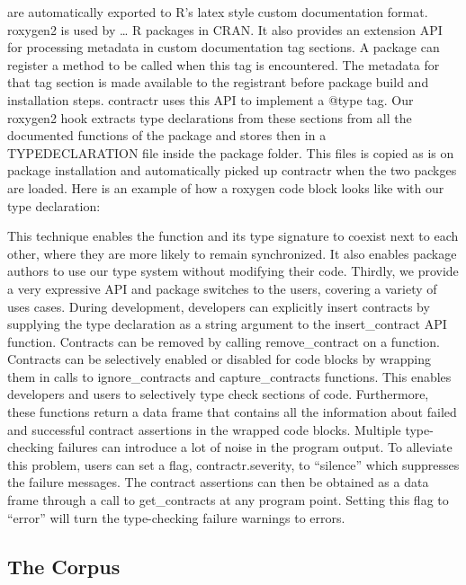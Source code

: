 \documentclass[acmsmall,review,anonymous]{acmart}\settopmatter{printfolios=true,printccs=false,printacmref=false}
\begin{document}
are automatically exported to R's latex style custom documentation format.
roxygen2 is used by … R packages in CRAN. It also provides an extension API for
processing metadata in custom documentation tag sections. A package can register
a method to be called when this tag is encountered. The metadata for that tag
section is made available to the registrant before package build and
installation steps. contractr uses this API to implement a @type tag. Our
roxygen2 hook extracts type declarations from these sections from all the
documented functions of the package and stores then in a TYPEDECLARATION file
inside the package folder. This files is copied as is on package installation
and automatically picked up contractr when the two packges are loaded.
Here is an example of how a roxygen code block looks like with our type declaration:


This technique enables the function and its type signature to coexist next to
each other, where they are more likely to remain synchronized. It also enables
package authors to use our type system without modifying their code.
Thirdly, we provide a very expressive API and package switches to the users,
covering a variety of uses cases. During development, developers can explicitly
insert contracts by supplying the type declaration as a string argument to the
insert\_contract API function. Contracts can be removed by calling
remove\_contract on a function. Contracts can be selectively enabled or disabled
for code blocks by wrapping them in calls to ignore\_contracts and
capture\_contracts functions. This enables developers and users to selectively
type check sections of code. Furthermore, these functions return a data frame
that contains all the information about failed and successful contract
assertions in the wrapped code blocks. Multiple type-checking failures can
introduce a lot of noise in the program output. To alleviate this problem, users
can set a flag, contractr.severity, to “silence” which suppresses the failure
messages. The contract assertions can then be obtained as a data frame through a
call to get\_contracts at any program point. Setting this flag to “error” will
turn the type-checking failure warnings to errors.

%
%
%
%
\subsection{The Corpus}

\end{document}
